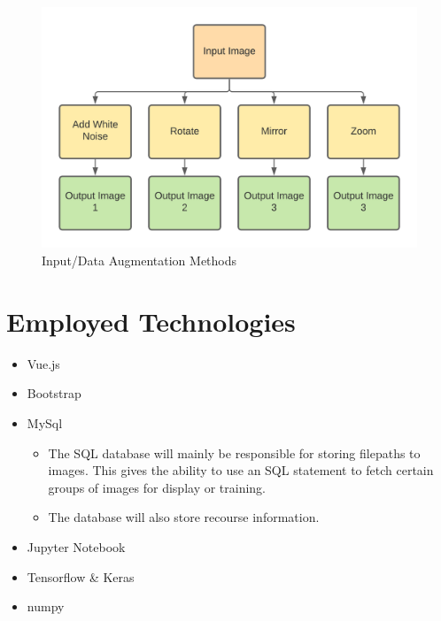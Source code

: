     \begin{figure}[H]
      \begin{center}
        \includegraphics[scale=0.7]{Images/Data_Augmentation}
        \caption{Input/Data Augmentation Methods}
        \label{fig:data_augmentation}
      \end{center}
    \end{figure}
\section{Employed Technologies}
  \begin{itemize}
    \item Vue.js
    \item Bootstrap
    \item MySql
    \begin{itemize}
      \item The SQL database will mainly be responsible for storing filepaths to images. This gives the ability to use an SQL statement to fetch certain groups of images for display or training.
      \item The database will also store recourse information.
    \end{itemize}
    \item Jupyter Notebook
    \item Tensorflow & Keras
    \item numpy
  \end{itemize}
